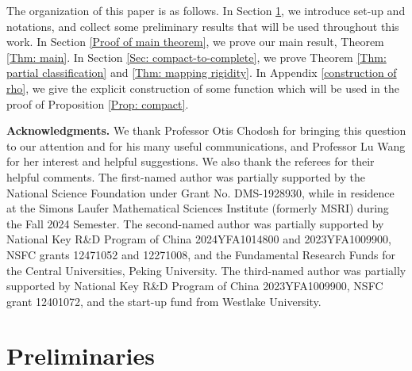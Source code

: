 \documentclass[11pt,letterpaper]{amsart}
\numberwithin{equation}{section}
\theoremstyle{definition}
\begin{document}
\bigskip

The organization of this paper is as follows. In Section \ref{Preliminaries}, we introduce set-up and notations, and collect some preliminary results that will be used throughout this work. In Section \ref{Proof of main theorem}, we prove our main result, Theorem \ref{Thm: main}. In Section \ref{Sec: compact-to-complete}, we prove
Theorem \ref{Thm: partial classification} and \ref{Thm: mapping rigidity}. In Appendix \ref{construction of rho}, we give the explicit construction of some function which will be used in the proof of Proposition \ref{Prop: compact}.

\bigskip

{\bf Acknowledgments. }We thank Professor Otis Chodosh for bringing this question to our attention and for his many useful communications, and Professor Lu Wang for her interest and helpful suggestions. {We also thank the referees for their helpful comments. 
The first-named author was partially supported by the National Science Foundation under Grant No. DMS-1928930, while in residence at the Simons Laufer Mathematical Sciences Institute (formerly MSRI) during the Fall 2024 Semester. The second-named author was partially supported by National Key R\&D Program of China 2024YFA1014800 and 2023YFA1009900, NSFC grants 12471052 and 12271008, and the Fundamental Research Funds for the Central Universities, Peking University. The third-named author was partially supported by National Key R\&D Program of China 2023YFA1009900, NSFC grant 12401072, and the start-up fund from Westlake University.}



\section{Preliminaries}\label{Preliminaries}
\end{document}
